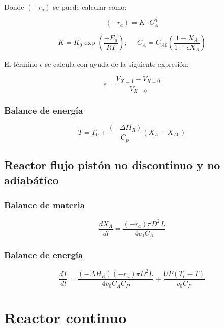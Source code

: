 \documentclass[20pt,a4paper]{extarticle}
\begin{document}
			Donde $(-r_a)$ se puede calcular como:
			
			\begin{equation*}
			(-r_a) = K \cdot C_{A}^n
			\end{equation*}
			
			\begin{equation*}
			K = K_0\exp\left(\frac{-E_a}{RT}\right);~~~~~~
			C_{A} = C_{A0}(\frac{1 - X_A}{1 + \epsilon X_A})
			\end{equation*}
			
				El término $\epsilon$ se calcula con ayuda de la siguiente expresión:
				
				\begin{equation*}
				\epsilon = \frac{V_{X=1} - V_{X=0}}{V_{X=0}}
				\end{equation*}
				
		\subsubsection{Balance de energía}
			\begin{equation*}
			T = T_0 + \frac{(-\Delta H_R)}{C_p}(X_A-X_{A0})
			\end{equation*}
		
		\subsection{Reactor flujo pistón no discontinuo y no adiabático}
		
		\subsubsection{Balance de materia}
		\begin{equation*}
		\frac{dX_A}{dl} = \frac{(-r_a)\pi D^2 L}{4v_0C_A} 
		\end{equation*}
		
		\subsubsection{Balance de energía}
		\begin{equation*}
		\frac{dT}{dl} = \frac{(-\Delta H_R)(-r_a)\pi D^2 L}{4v_0C_AC_P} + \frac{UP(T_c-T)}{v_0C_P}
		\end{equation*}
		
		
\section{Reactor continuo}
\end{document}
